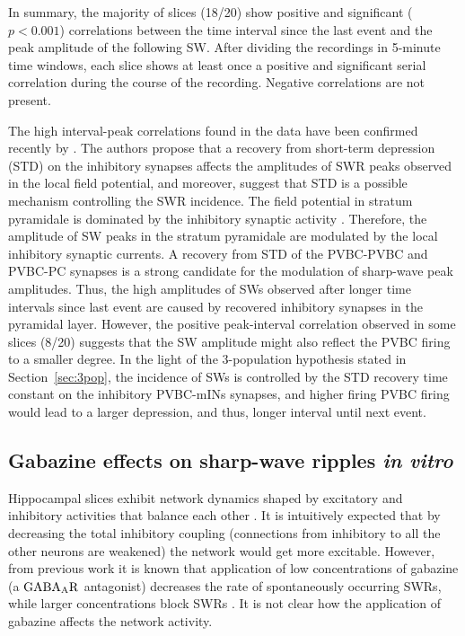     In summary, the majority of slices (18/20) show positive and significant
    ($p<0.001$) correlations between the time interval since the last event and the
    peak amplitude of the following SW. After dividing the recordings in
    5-minute time windows, each slice shows at least once a positive and
    significant serial correlation during the course of the recording. Negative
    correlations are not present.

    The high interval-peak correlations found in the data have been confirmed
    recently by \cite{Kohus2016}. The authors propose that a recovery from
    short-term depression (STD) on the inhibitory synapses affects the
    amplitudes of SWR peaks observed in the local field potential, and
    moreover, suggest that STD is a possible mechanism controlling the SWR
    incidence. The field potential in stratum pyramidale is dominated by the
    inhibitory synaptic activity \citep{Schonberger2014}. Therefore, the
    amplitude of SW peaks in the stratum pyramidale are modulated by the local
    inhibitory synaptic currents. A recovery from STD of the PVBC-PVBC and
    PVBC-PC synapses is a strong candidate for the modulation of sharp-wave
    peak amplitudes. Thus, the high amplitudes of SWs observed after longer
    time intervals since last event are caused by recovered inhibitory synapses
    in the pyramidal layer. However, the positive peak-interval correlation
    observed in some slices (8/20) suggests that the SW amplitude might also
    reflect the PVBC firing to a smaller degree. In the light of the
    3-population hypothesis stated in Section~\ref{sec:3pop}, the incidence of
    SWs is controlled by the STD recovery time constant on the inhibitory
    PVBC-mINs synapses, and higher firing PVBC firing would lead to a larger
    depression, and thus, longer interval until next event.

  \subsection{Gabazine effects on sharp-wave ripples {\textit {in vitro}} }
    \label{sec:gabazine_invitro}
    Hippocampal slices exhibit network dynamics shaped by excitatory and
    inhibitory activities that balance each other \citep{Csicsvari1999,
    Maier2011, English2014, Hulse2016}. It is intuitively expected that by
    decreasing the total inhibitory coupling (connections from inhibitory to
    all the other neurons are weakened) the network would get more excitable.
    However, from previous work \citep[e.g.,][]{Nimmrich2005} it is known that
    application of low concentrations of gabazine (a $\rm GABA_AR$ antagonist)
    decreases the rate of spontaneously occurring SWRs, while larger
    concentrations block SWRs \citep{Maier2003, Ellender2010}. It is not clear
    how the application of gabazine affects the network activity. 
    
